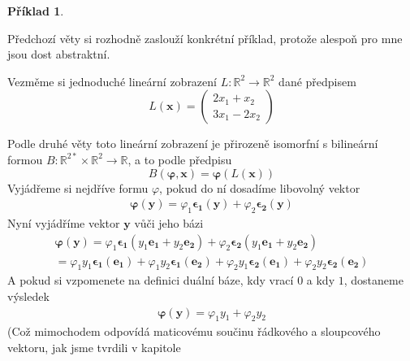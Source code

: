 \documentclass[a5paper,12pt]{amsbook}
\theoremstyle{definition}
\newtheorem{example}{Příklad}[chapter]
\newcommand{\myvec}[1]{\bm{#1}}
\newcommand{\myspace}[1]{\mathbb{#1}}
\begin{document}
\begin{example}
\label{example:tensor-isomorphisms}

\noindent
Předchozí věty si rozhodně zaslouží konkrétní příklad, protože alespoň pro mne jsou dost
abstraktní.

Vezměme si jednoduché lineární zobrazení $L: \myspace{R}^2\rightarrow\myspace{R}^2$ dané předpisem
\begin{equation*}
L(\myvec{x}) = \left(
\begin{array}{c}
2 x_1 + x_2 \\
3 x_1 - 2 x_2
\end{array}
\right)
\end{equation*}

Podle druhé věty toto lineární zobrazení je přirozeně isomorfní s bilineární formou
$B: \myspace{R}^{2*}\times\myspace{R}^2\rightarrow\myspace{R}$, a to podle předpisu
\begin{equation*}
B(\myvec{\varphi}, \myvec{x}) = \myvec{\varphi}(L(\myvec{x}))
\end{equation*}
Vyjádřeme si nejdříve formu $\varphi$, pokud do ní dosadíme libovolný vektor
\begin{equation*}
\begin{split}
\myvec{\varphi}(\myvec{y}) = \varphi_1\myvec{\epsilon_1}(\myvec{y}) + \varphi_2\myvec{\epsilon_2}(\myvec{y})
\end{split}
\end{equation*}
Nyní vyjádříme vektor $\myvec{y}$ vůči jeho bázi
\begin{equation*}
\begin{split}
\myvec{\varphi}(\myvec{y}) 
  = \varphi_1\myvec{\epsilon_1}(y_1\myvec{e_1} + y_2\myvec{e_2}) + \varphi_2\myvec{\epsilon_2}(y_1\myvec{e_1} + y_2\myvec{e_2}) \\
= \varphi_1 y_1\myvec{\epsilon_1}(\myvec{e_1}) + \varphi_1 y_2\myvec{\epsilon_1}(\myvec{e_2}) 
  + \varphi_2 y_1\myvec{\epsilon_2}(\myvec{e_1}) + \varphi_2 y_2\myvec{\epsilon_2}(\myvec{e_2})
\end{split}
\end{equation*}
A pokud si vzpomenete na definici duální báze, kdy vrací $0$ a kdy $1$, dostaneme výsledek
\begin{equation*}
\begin{split}
\myvec{\varphi}(\myvec{y}) = \varphi_1 y_1 + \varphi_2 y_2
\end{split}
\end{equation*}
(Což mimochodem odpovídá maticovému součinu řádkového a sloupcového vektoru, jak jsme tvrdili v kapitole

\end{example}
\end{document}
